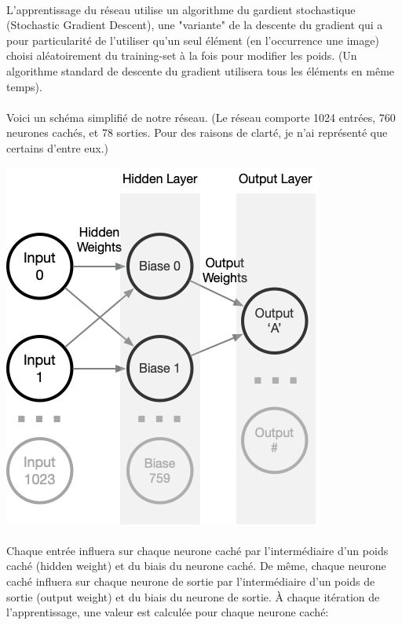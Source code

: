 \documentclass{article}
\begin{document}
\paragraph{}L'apprentissage du réseau utilise un algorithme du gardient stochastique (Stochastic Gradient Descent), une "variante" de la descente du gradient qui a pour particularité de l'utiliser qu'un seul élément (en l'occurrence une image) choisi aléatoirement du training-set à la fois pour modifier les poids. (Un algorithme standard de descente du gradient utilisera tous les éléments en même temps).

\paragraph{}Voici un schéma simplifié de notre réseau.
(Le réseau comporte 1024 entrées, 760 neurones cachés, et 78 sorties. Pour des raisons de clarté, je n'ai représenté que certains d'entre eux.)

\begin{center}
	\includegraphics[scale=0.5]{Neuron}
\end{center}

\paragraph{} Chaque entrée influera sur chaque neurone caché par l’intermédiaire d’un poids caché (hidden weight) et du biais du neurone caché.
De même, chaque neurone caché influera sur chaque neurone de sortie par l’intermédiaire d’un poids de sortie (output weight) et du biais du neurone de sortie.
À chaque itération de l’apprentissage, une valeur est calculée pour chaque neurone caché:
\newline
\end{document}
